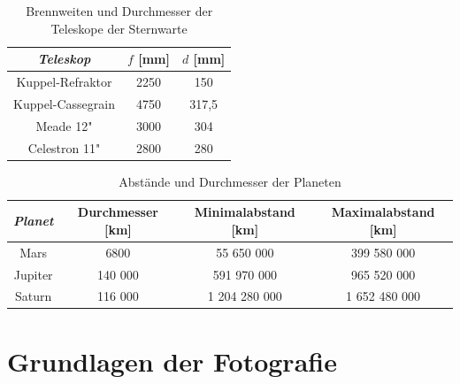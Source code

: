 \documentclass[10pt,a4paper,titlepage]{article}
\begin{document}
\begin{table}
\begin{center}
\begin{tabular}{|c|c|c|}
\hline
\emph{Teleskop} & $f$ [mm] & $d$ [mm] \\
\hline
Kuppel-Refraktor & 2250 & 150 \\
Kuppel-Cassegrain & 4750 & 317,5 \\
Meade 12" & 3000 & 304 \\
Celestron 11" & 2800 & 280 \\
\hline
\end{tabular}
\caption{Brennweiten und Durchmesser der Teleskope der Sternwarte}
\label{stw-teleskope}
\end{center}
\end{table}

\begin{table}
\begin{center}
\begin{tabular}{|c|c|c|c|}
\hline
\emph{Planet} & Durchmesser [km] & Minimalabstand [km] & Maximalabstand [km] \\
\hline
Mars & 6800 & 55 650 000 & 399 580 000 \\
Jupiter & 140 000 & 591 970 000 & 965 520 000 \\
Saturn & 116 000 & 1 204 280 000 & 1 652 480 000\\
\hline
\end{tabular}
\caption{Abstände und Durchmesser der Planeten}
\label{planeten}
\end{center}
\end{table}

\section{Grundlagen der Fotografie}
\end{document}

